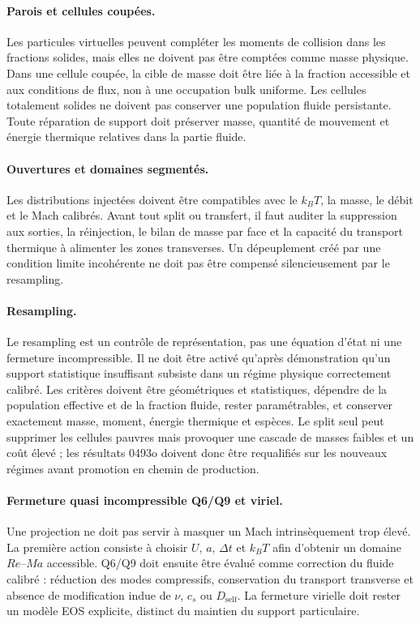 \documentclass[11pt,a4paper]{article}
\begin{document}
\paragraph{Parois et cellules coupées.}
Les particules virtuelles peuvent compléter les moments de collision dans les fractions solides, mais elles ne doivent pas être comptées comme masse physique. Dans une cellule coupée, la cible de masse doit être liée à la fraction accessible et aux conditions de flux, non à une occupation bulk uniforme. Les cellules totalement solides ne doivent pas conserver une population fluide persistante. Toute réparation de support doit préserver masse, quantité de mouvement et énergie thermique relatives dans la partie fluide.

\paragraph{Ouvertures et domaines segmentés.}
Les distributions injectées doivent être compatibles avec le $k_BT$, la masse, le débit et le Mach calibrés. Avant tout split ou transfert, il faut auditer la suppression aux sorties, la réinjection, le bilan de masse par face et la capacité du transport thermique à alimenter les zones transverses. Un dépeuplement créé par une condition limite incohérente ne doit pas être compensé silencieusement par le resampling.

\paragraph{Resampling.}
Le resampling est un contrôle de représentation, pas une équation d'état ni une fermeture incompressible. Il ne doit être activé qu'après démonstration qu'un support statistique insuffisant subsiste dans un régime physique correctement calibré. Les critères doivent être géométriques et statistiques, dépendre de la population effective et de la fraction fluide, rester paramétrables, et conserver exactement masse, moment, énergie thermique et espèces. Le split seul peut supprimer les cellules pauvres mais provoquer une cascade de masses faibles et un coût élevé ; les résultats 0493o doivent donc être requalifiés sur les nouveaux régimes avant promotion en chemin de production.

\paragraph{Fermeture quasi incompressible Q6/Q9 et viriel.}
Une projection ne doit pas servir à masquer un Mach intrinsèquement trop élevé. La première action consiste à choisir $U$, $a$, $\Delta t$ et $k_BT$ afin d'obtenir un domaine $Re$--$Ma$ accessible. Q6/Q9 doit ensuite être évalué comme correction du fluide calibré : réduction des modes compressifs, conservation du transport transverse et absence de modification indue de $\nu$, $c_s$ ou $D_{\mathrm{self}}$. La fermeture virielle doit rester un modèle EOS explicite, distinct du maintien du support particulaire.
\end{document}
